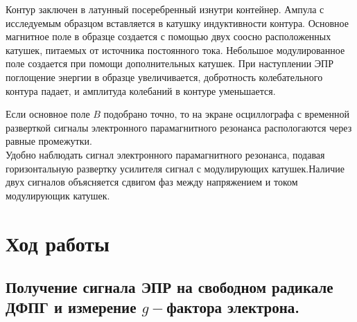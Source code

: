 \documentclass[a4paper]{article}
\begin{document}

Контур заключен в латунный посеребренный изнутри контейнер. Ампула с исследуемым образцом вставляется в катушку индуктивности контура. Основное магнитное поле в образце создается с помощью двух соосно расположенных катушек, питаемых от источника постоянного тока. Небольшое модулированное поле создается при помощи дополнительных катушек. 
При наступлении ЭПР поглощение энергии  в образце увеличивается, добротность колебательного контура падает, и амплитуда колебаний в контуре уменьшается. 


Если основное поле $B$ подобрано точно, то на экране осциллографа с временной разверткой сигналы электронного парамагнитного резонанса распологаются через равные промежутки.\\
Удобно наблюдать сигнал электронного парамагнитного резонанса, подавая горизонтальную развертку усилителя сигнал с модулирующих катушек.Наличие двух сигналов объясняется сдвигом фаз между напряжением и током модулирующик катушек.


\section{Ход работы}

\subsection{Получение сигнала ЭПР на свободном радикале ДФПГ и измерение $g-$фактора электрона.}
\end{document}
